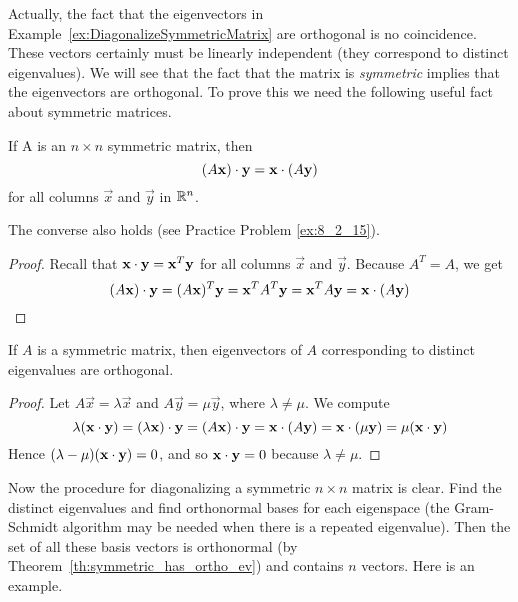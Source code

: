 \documentclass{ximera}
\begin{document}
Actually, the fact that the eigenvectors in Example~\ref{ex:DiagonalizeSymmetricMatrix} are orthogonal is no coincidence. These vectors certainly must be linearly independent (they correspond to distinct eigenvalues).  We will see that the fact that the matrix is \textit{symmetric} implies that the eigenvectors are orthogonal. To prove this we need the following useful fact about symmetric matrices.

\begin{theorem}\label{th:dotpSymmetric}
If A is an $n \times n$ symmetric matrix, then
\begin{equation*}
(A\mathbf{x}) \cdot \mathbf{y} = \mathbf{x} \cdot (A\mathbf{y})
\end{equation*}
for all columns $\vec{x}$ and $\vec{y}$ in $\mathbb{R}^n$.
\end{theorem}

\begin{remark}
The converse also holds (see Practice Problem \ref{ex:8_2_15}).
\end{remark}

\begin{proof}
Recall that $\mathbf{x} \cdot \mathbf{y} = \mathbf{x}^{T} \mathbf{y}$ for all columns $\vec{x}$ and $\vec{y}$. Because $A^{T} = A$, we get
\begin{equation*}
(A\mathbf{x}) \cdot \mathbf{y} = (A\mathbf{x})^T\mathbf{y} = \mathbf{x}^TA^T\mathbf{y} =  \mathbf{x}^TA\mathbf{y} = \mathbf{x} \cdot (A\mathbf{y})
\end{equation*}
\end{proof}

\begin{theorem}\label{th:symmetric_has_ortho_ev}
If $A$ is a symmetric matrix, then eigenvectors of $A$ corresponding to distinct eigenvalues are orthogonal.
\end{theorem}

\begin{proof}
Let $A\vec{x} = \lambda \vec{x}$ and $A\vec{y} = \mu \vec{y}$, where $\lambda \neq \mu$. We compute
\begin{equation*}
\lambda(\mathbf{x} \cdot \mathbf{y}) = (\lambda\mathbf{x}) \cdot \mathbf{y} = (A\mathbf{x}) \cdot \mathbf{y} = \mathbf{x} \cdot (A\mathbf{y}) = \mathbf{x} \cdot (\mu\mathbf{y}) = \mu(\mathbf{x} \cdot \mathbf{y})
\end{equation*}
Hence $(\lambda - \mu)(\mathbf{x} \cdot \mathbf{y}) = 0$, and so $\mathbf{x} \cdot \mathbf{y} = 0$ because $\lambda \neq \mu$.
\end{proof}

Now the procedure for diagonalizing a symmetric $n \times n$ matrix is clear. Find the distinct eigenvalues
 and find orthonormal bases for each eigenspace (the Gram-Schmidt
algorithm may be needed when there is a repeated eigenvalue). Then the set of all these basis vectors is
orthonormal (by Theorem~\ref{th:symmetric_has_ortho_ev}) and contains $n$ vectors. Here is an example.
\end{document}
